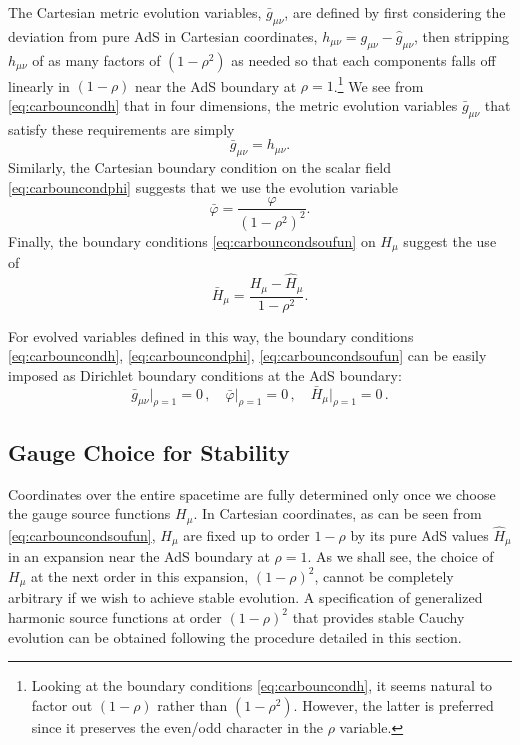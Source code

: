 \documentclass[a4paper,11pt]{article}
\numberwithin{equation}{section}
\begin{document}
The Cartesian metric evolution variables, $\bar{g}_{\mu\nu}$, are defined by first considering the deviation from pure AdS in Cartesian coordinates, $h_{\mu\nu}=g_{\mu\nu}-\hat{g}_{\mu\nu}$, then stripping $h_{\mu\nu}$ of as many factors of $(1-\rho^2)$ as needed so that each components falls off linearly in $(1-\rho)$ near the AdS boundary at $\rho=1$.\footnote{Looking at the boundary conditions \eqref{eq:carbouncondh}, it seems natural to factor out $(1-\rho)$ rather than $(1-\rho^2)$. However, the latter is preferred since it preserves the even/odd character in the $\rho$ variable.}
We see from \eqref{eq:carbouncondh} that in four dimensions, the metric evolution variables $\bar{g}_{\mu\nu}$ that satisfy these requirements are simply 
\begin{equation}\label{eq:gbarcart}
\bar{g}_{\mu\nu}=h_{\mu\nu}.
\end{equation}
Similarly, the Cartesian boundary condition on the scalar field \eqref{eq:carbouncondphi} suggests that we use the evolution variable
\begin{equation}
\label{eq:phibarcart}
\bar{\varphi}=\frac{\varphi }{(1-\rho^2)^2}.
\end{equation}
Finally, the boundary conditions \eqref{eq:carbouncondsoufun} on $H_\mu$ suggest the use of
\begin{equation}\label{eq:soufunb}
\bar{H}_\mu=\frac{H_\mu-\hat{H}_\mu}{1-\rho^2 }.
\end{equation}

For evolved variables defined in this way, the boundary conditions \eqref{eq:carbouncondh}, \eqref{eq:carbouncondphi}, \eqref{eq:carbouncondsoufun} can be easily imposed as  Dirichlet boundary conditions at the AdS boundary:
\begin{equation}
\label{eq:dirbc}
 \bar{g}_{\mu\nu}\big|_{\rho=1}=0\,,\quad \bar{\varphi}\big|_{\rho=1}=0\,,\quad \bar{H}_\mu\big|_{\rho=1}=0\,.
 \end{equation}



\subsection{Gauge Choice for Stability}\label{sec:gauge_choice}

Coordinates over the entire spacetime are fully determined only once we choose the gauge source functions $H_\mu$. 
In Cartesian coordinates, as can be seen from \eqref{eq:carbouncondsoufun}, $H_\mu$ are fixed up to order $1-\rho$ by its pure AdS values $\hat{H}_\mu$ in an expansion near the AdS boundary at $\rho=1$.
As we shall see, the choice of $H_\mu$ at the next order in this expansion, $(1-\rho)^2$, cannot be completely arbitrary if we wish to achieve stable evolution.
A specification of generalized harmonic source functions at order $(1-\rho)^2$ that provides stable Cauchy evolution can be obtained following the procedure detailed in this section.
\end{document}
